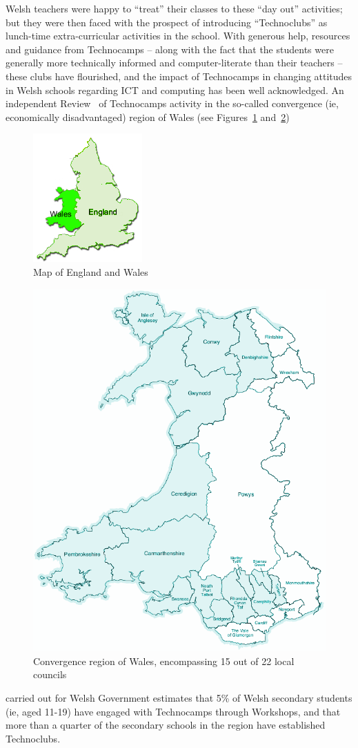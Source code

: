 \documentclass{sig-alternate}
\begin{document}
Welsh teachers were happy to ``treat'' their classes
to these ``day out'' activities; but they were then faced with
the prospect of introducing ``Technoclubs'' as lunch-time
extra-curricular activities in the school.
With generous help, resources and guidance from Technocamps
-- along with the fact that the students were generally
more technically informed and computer-literate than their teachers -- 
these clubs have flourished, and the impact of Technocamps
in changing attitudes in Welsh schools regarding ICT and computing
has been well acknowledged.
An independent Review~\cite{Wavehill:2015}
of Technocamps activity in the so-called convergence
(ie, economically disadvantaged) region of Wales
(see Figures~\ref{fig:UK} and~\ref{fig:wales})
\begin{figure}
  \centering
  \includegraphics[width=0.45\columnwidth]{images/UK.png}
  \caption{Map of England and Wales}
  \label{fig:UK}
\end{figure}
\begin{figure}
  \centering
  \includegraphics[width=0.45\columnwidth]{images/wales.png}
  \caption{Convergence region of Wales, encompassing 15 out of 22 local councils}
  \label{fig:wales}
\end{figure}
carried out for Welsh Government estimates that
5\% of Welsh secondary students (ie, aged 11-19)
have engaged with Technocamps through Workshops,
and that more than a quarter of the secondary schools
in the region have established Technoclubs.
\end{document}
